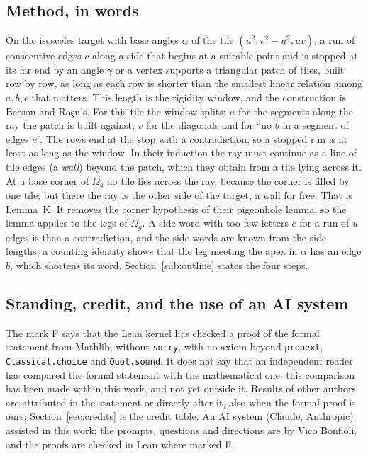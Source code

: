 \documentclass[11pt,reqno]{amsart}
\theoremstyle{plain}
\theoremstyle{definition}
\newcommand{\sF}{\textup{\textsf{F}}}
\begin{document}
\subsection{Method, in words}\label{sub:ideas}
On the isosceles target with base angles $\alpha$ of the tile $(u^2,v^2-u^2,uv)$, a run of consecutive edges $c$ along a side
that begins at a suitable point and is stopped at its far end by an angle $\gamma$ or a vertex supports a triangular patch of tiles, built row by row, as long as each
row is shorter than the smallest linear relation among $a,b,c$ that matters. This length is the rigidity window, and the construction is Beeson and
Ro\c{s}u's. For this tile the window splits: $u$ for the segments along the ray the patch is built against, $v$ for the diagonals and for ``no $b$ in a segment of edges $c$''. The rows end at the stop with a contradiction, so a stopped run is at least as long
as the window. In their induction the ray must continue as a line of tile edges (a \emph{wall}) beyond the patch, which they obtain from a tile lying across it. At a base corner of $\Omega_{g}$ no tile lies across the ray, because the corner is filled by one tile; but there the ray is the other side of the target, a wall for free. That is Lemma~K. It removes the corner hypothesis of their pigeonhole lemma, so the lemma applies to the legs of $\Omega_{g}$. A side word with too few letters $c$ for a run of $u$ edges is then a contradiction, and the
side words are known from the side lengths; a counting identity shows that the leg meeting the apex in $\alpha$ has an edge $b$, which shortens its word.
Section~\ref{sub:outline} states the four steps.

\subsection{Standing, credit, and the use of an AI system}
The mark \sF{} says that the Lean kernel has checked a proof of the formal statement from Mathlib, without \texttt{sorry}, with no
axiom beyond \texttt{propext}, \texttt{Classical.choice} and \texttt{Quot.sound}. It does not say that an independent reader has
compared the formal statement with the mathematical one: this comparison has been made within this work, and not yet outside it.
Results of other authors are attributed in the statement or directly after it, also when the formal proof is ours; Section~\ref{sec:credits} is the credit table.
An AI system (Claude, Anthropic) assisted in this work; the prompts, questions and directions are by Vico Bonfioli, and the proofs are checked in Lean where marked \sF.
\end{document}
